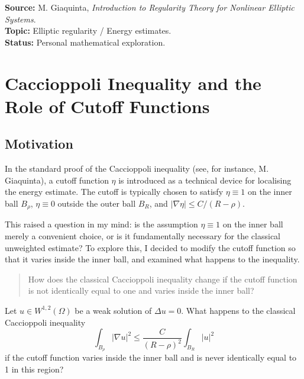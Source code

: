 \noindent\textbf{Source:} M. Giaquinta, \emph{Introduction to Regularity Theory for Nonlinear Elliptic Systems}.\\
\textbf{Topic:} Elliptic regularity / Energy estimates.\\
\textbf{Status:} Personal mathematical exploration.
\section{Caccioppoli Inequality and the Role of Cutoff Functions}

\subsection*{Motivation}
In the standard proof of the Caccioppoli inequality (see, for instance, M. Giaquinta), a cutoff function $\eta$ is introduced as a technical device for localising the energy estimate. The cutoff is typically chosen to satisfy $\eta \equiv 1$ on the inner ball $B_\rho$, $\eta \equiv 0$ outside the outer ball $B_R$, and $|\nabla \eta| \le C/(R-\rho)$.

This raised a question in my mind: is the assumption $\eta \equiv 1$ on the inner ball merely a convenient choice, or is it fundamentally necessary for the classical unweighted estimate? To explore this, I decided to modify the cutoff function so that it varies inside the inner ball, and examined what happens to the inequality.

\begin{quote}
    How does the classical Caccioppoli inequality change if the cutoff function is not identically equal to one and varies inside the inner ball?
\end{quote}

\begin{question}
    Let $u \in W^{1,2}(\Omega)$ be a weak solution of $\Delta u = 0$. What happens to the classical Caccioppoli inequality
    \[
    \int_{B_\rho} |\nabla u|^2 \le \frac{C}{(R-\rho)^2} \int_{B_R} |u|^2
    \]
    if the cutoff function varies inside the inner ball and is never identically equal to 1 in this region?
\end{question}

